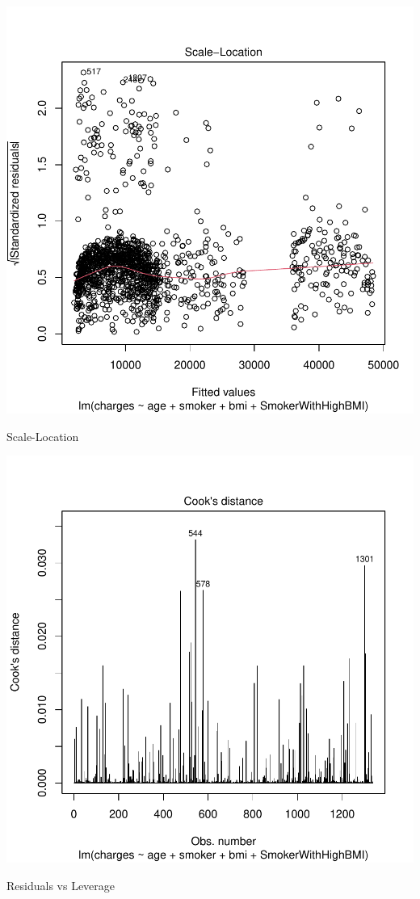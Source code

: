 \documentclass{article}
\begin{document}
\begin{centerfig}
\includegraphics{Untitled-061}
\caption{Scale-Location}
\end{centerfig}


\begin{centerfig}
\includegraphics{Untitled-062}
\caption{Residuals vs Leverage}
\end{centerfig}
\end{document}
